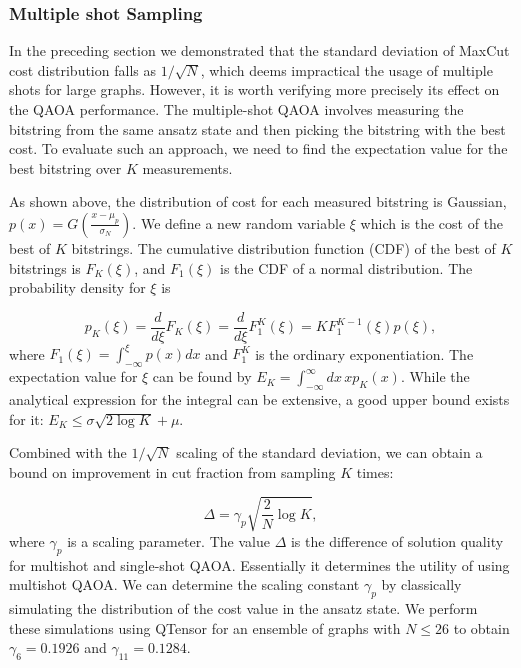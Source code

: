 \documentclass[prb,reprint,nofootinbib,longbibliography,superscriptaddress]{revtex4-1}
\begin{document}
\subsubsection{Multiple shot Sampling}
\label{sec:multi-shot}


In the preceding section we demonstrated that the  standard deviation of MaxCut cost distribution falls as $1/\sqrt{N}$, which deems impractical the usage of multiple shots for large graphs. However, it is worth verifying more precisely  its effect  on the QAOA performance.
The multiple-shot QAOA involves measuring the bitstring from the same ansatz state and then picking the bitstring with the best cost. 
To evaluate such an approach, we need to find the expectation value for the best bitstring over $K$ measurements.

As shown above, the distribution of cost for each measured bitstring is  Gaussian, $p(x) = G(\frac{x-\mu_p}{\sigma_N})$.
We define a new random variable $\xi$ which is the cost of the best of $K$ bitstrings.
The cumulative distribution function (CDF) of the best of $K$ bitstrings is $F_K(\xi)$, and $F_1(\xi)$ is the CDF of a normal distribution.
The probability density for $\xi$ is

\begin{equation}
    p_K(\xi) = \frac{d}{d\xi} F_K(\xi) =\frac{d}{d\xi} F_1^K(\xi)
    = K F_1^{K-1}(\xi) p(\xi),
\end{equation}
where  $F_1(\xi) = \int_{-\infty}^\xi p(x) d x$ and $F_1^K$ is the ordinary exponentiation.
The expectation value for $\xi$ can be found by $E_K = \int_{-\infty}^\infty d x \, x p_K(x)$.
While the analytical expression for the integral can be extensive,  a good upper bound exists for it: $E_K\leq \sigma\sqrt{2 \log K} + \mu$.

Combined with the $1/\sqrt N$ scaling of the standard deviation, we can obtain a bound on
improvement in cut fraction from sampling $K$ times:

\begin{equation}
\label{eq:multi-shot}
    \Delta = \gamma_p\sqrt{\frac{2}{N} \log K},
\end{equation}
where $\gamma_p$ is a scaling parameter.
The value $\Delta$ is the difference of solution quality for multishot and single-shot QAOA. Essentially it determines the utility of using multishot QAOA.
We can determine the scaling constant $\gamma_p$ by classically simulating
the distribution of the cost value in the ansatz state. 
We perform these simulations using QTensor for an ensemble of graphs with $N\leq 26$ to obtain
$\gamma_6 = 0.1926$ and $\gamma_{11} = 0.1284$.
\end{document}
